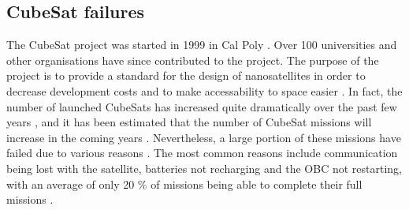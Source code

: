 \documentclass[english,12pt,a4paper,pdftex,elec,utf8]{aaltothesis}
\begin{document}
\subsection{CubeSat failures}
The CubeSat project was started in 1999 in Cal Poly \cite{cds}. Over 100 universities and other organisations have since contributed to the project. The purpose of the project is to provide a standard for the design of nanosatellites in order to decrease development costs and to make accessability to space easier \cite{cds}. In fact, the number of launched CubeSats has increased quite dramatically over the past few years \cite{Swart2016}, and it has been estimated that the number of CubeSat missions will increase in the coming years \cite{SpaceWorks2017}. Nevertheless, a large portion of these missions have failed due to various reasons \cite{Swart2016, Swart1, Swart2015}. The most common reasons include communication being lost with the satellite, batteries not recharging and the OBC not restarting, with an average of only 20 \% of missions being able to complete their full missions \cite{Swart2016}. \par 
\end{document}
